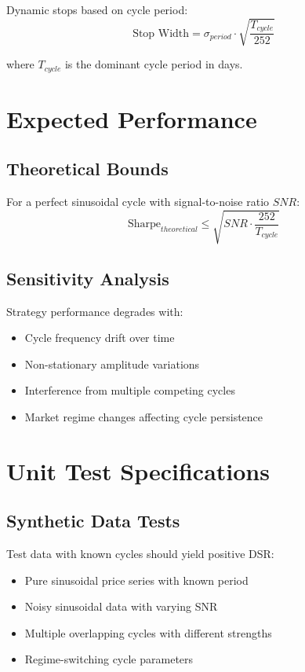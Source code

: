 \documentclass{article}
\begin{document}
Dynamic stops based on cycle period:
\begin{equation}
\text{Stop Width} = \sigma_{period} \cdot \sqrt{\frac{T_{cycle}}{252}}
\end{equation}

where $T_{cycle}$ is the dominant cycle period in days.

\section{Expected Performance}

\subsection{Theoretical Bounds}

For a perfect sinusoidal cycle with signal-to-noise ratio $SNR$:
\begin{equation}
\text{Sharpe}_{theoretical} \leq \sqrt{SNR \cdot \frac{252}{T_{cycle}}}
\end{equation}

\subsection{Sensitivity Analysis}

Strategy performance degrades with:
\begin{itemize}
\item Cycle frequency drift over time
\item Non-stationary amplitude variations
\item Interference from multiple competing cycles
\item Market regime changes affecting cycle persistence
\end{itemize}

\section{Unit Test Specifications}

\subsection{Synthetic Data Tests}

Test data with known cycles should yield positive DSR:
\begin{itemize}
\item Pure sinusoidal price series with known period
\item Noisy sinusoidal data with varying SNR
\item Multiple overlapping cycles with different strengths
\item Regime-switching cycle parameters
\end{itemize}
\end{document}
